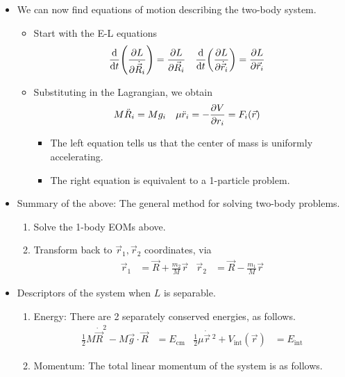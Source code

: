 \documentclass[../notes.tex]{subfiles}
\begin{document}
\begin{itemize}
\begin{itemize}
    \end{itemize}
    \item We can now find equations of motion describing the two-body system.
    \begin{itemize}
        \item Start with the E-L equations
        \begin{align*}
            \dv{t}(\pdv{L}{\dot{\vec{R}}_i}) &= \pdv{L}{\vec{R}_i}&
            \dv{t}(\pdv{L}{\dot{\vec{r}}_i}) &= \pdv{L}{\vec{r}_i}
        \end{align*}
        \item Substituting in the Lagrangian, we obtain
        \begin{align*}
            M\ddot{R}_i &= Mg_i&
            \mu\ddot{r}_i &= -\pdv{V}{r_i} = F_i(\vec{r})
        \end{align*}
        \begin{itemize}
            \item The left equation tells us that the center of mass is uniformly accelerating.
            \item The right equation is equivalent to a 1-particle problem.
        \end{itemize}
    \end{itemize}
    \item Summary of the above: The general method for solving two-body problems.
    \begin{enumerate}
        \item Solve the 1-body EOMs above.
        \item Transform back to $\vec{r}_1,\vec{r}_2$ coordinates, via
        \begin{align*}
            \vec{r}_1 &= \vec{R}+\frac{m_2}{M}\vec{r}&
            \vec{r}_2 &= \vec{R}-\frac{m_1}{M}\vec{r}
        \end{align*}
    \end{enumerate}
    \item Descriptors of the system when $L$ is separable.
    \begin{enumerate}
        \item Energy: There are 2 separately conserved energies, as follows.
        \begin{align*}
            \frac{1}{2}M\dot{\vec{R}}^2-M\vec{g}\cdot\vec{R} &= E_\text{cm}&
            \frac{1}{2}\mu\dot{\vec{r}}{\,}^2+V_\text{int}(\vec{r}) &= E_\text{int}
        \end{align*}
        \item Momentum: The total linear momentum of the system is as follows.

\end{enumerate}
\end{itemize}
\end{document}
